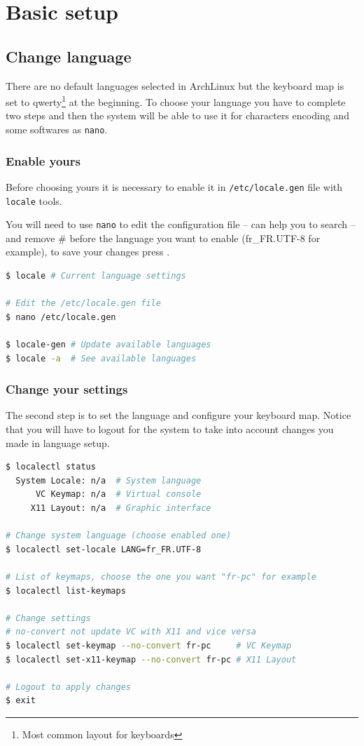 \chapter{Basic setup}

\section{Change language}
There are no default languages selected in ArchLinux but the keyboard map is set to 
qwerty\footnote{Most common layout for keyboards} at the beginning. To choose 
your language you have to complete two steps and then the system will be able to 
use it for characters encoding and some softwares as \texttt{nano}.

\subsection{Enable yours}
Before choosing yours it is necessary to enable it in \texttt{/etc/locale.gen}
file with \texttt{locale} tools. 

You will need to use \texttt{nano} to edit the configuration file --  can help you to search -- and remove \og\#\fg{} before the language you want 
to enable (fr\_FR.UTF-8 for example), to save your changes press .
\\
\begin{lstlisting}[language=bash,caption=Enable your language]
$ locale # Current language settings

# Edit the /etc/locale.gen file
$ nano /etc/locale.gen

$ locale-gen # Update available languages
$ locale -a  # See available languages
\end{lstlisting}

\subsection{Change your settings}
The second step is to set the language and configure your keyboard map. 
Notice that you will have to logout for the system to take into account 
changes you made in language setup.
\\ 
\begin{lstlisting}[language=bash,caption=Change language settings]
$ localectl status
  System Locale: n/a  # System language
      VC Keymap: n/a  # Virtual console
     X11 Layout: n/a  # Graphic interface
     
# Change system language (choose enabled one)
$ localectl set-locale LANG=fr_FR.UTF-8

# List of keymaps, choose the one you want "fr-pc" for example
$ localectl list-keymaps

# Change settings 
# no-convert not update VC with X11 and vice versa
$ localectl set-keymap --no-convert fr-pc     # VC Keymap
$ localectl set-x11-keymap --no-convert fr-pc # X11 Layout

# Logout to apply changes
$ exit
\end{lstlisting}

